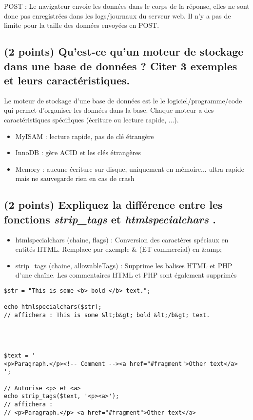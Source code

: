\documentclass[11pt,a4paper]{article}
\begin{document}
POST : Le navigateur envoie les données dans le corps de la réponse, elles ne sont donc pas enregistrées dans les logs/journaux du serveur web.
Il n'y a pas de limite pour la taille des données envoyées en POST.

\bigskip

\subsection{(2 points) Qu'est-ce qu'un moteur de stockage dans une base de données ? Citer 3 exemples et leurs caractéristiques.}

\bigskip

Le moteur de stockage d'une base de données est le le logiciel/programme/code qui permet d'organiser les données dans la base.
Chaque moteur a des caractéristiques spécifiques (écriture ou lecture rapide, ...).

\begin{itemize}
\item MyISAM : lecture rapide, pas de clé étrangère
\item InnoDB : gère ACID et les clés étrangères
\item Memory : aucune écriture sur disque, uniquement en mémoire... ultra rapide mais ne sauvegarde rien en cas de crash
\end{itemize}

\bigskip

\subsection{(2 points) Expliquez la différence entre les fonctions \textit{strip\_tags} et \textit{htmlspecialchars} .}

\bigskip

\begin{itemize}
\item htmlspecialchars (chaine, flags) : Conversion des caractères spéciaux en entités HTML. Remplace par exemple \& (ET commercial) en \&amp;
\item strip\_tags (chaine, allowableTags) : Supprime les balises HTML et PHP d'une chaîne. Les commentaires HTML et PHP sont également supprimés
\end{itemize}

\bigskip

\lstset{language=php}
\begin{lstlisting}[frame=single]
$str = "This is some <b> bold </b> text.";

echo htmlspecialchars($str);
// affichera : This is some &lt;b&gt; bold &lt;/b&gt; text.




$text = '
<p>Paragraph.</p><!-- Comment --><a href="#fragment">Other text</a>
';

// Autorise <p> et <a>
echo strip_tags($text, '<p><a>');
// affichera :
// <p>Paragraph.</p> <a href="#fragment">Other text</a>
\end{lstlisting}
\end{document}
